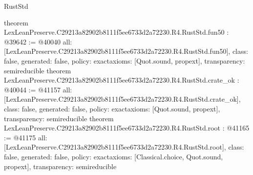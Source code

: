 \begin{lexlean}{RustStd}
\begin{coremodule}
{}
theorem LexLeanPreserve.C29213a82902b8111f5ee6733d2a72230.R4.RustStd.fun50 : @39642 := @40040 {
  all: [LexLeanPreserve.C29213a82902b8111f5ee6733d2a72230.R4.RustStd.fun50],
  class: false,
  generated: false,
  policy: exact{axioms: [Quot.sound, propext]},
  transparency: semireducible
}
theorem LexLeanPreserve.C29213a82902b8111f5ee6733d2a72230.R4.RustStd.crate_ok : @40044 := @41157 {
  all: [LexLeanPreserve.C29213a82902b8111f5ee6733d2a72230.R4.RustStd.crate_ok],
  class: false,
  generated: false,
  policy: exact{axioms: [Quot.sound, propext]},
  transparency: semireducible
}
theorem LexLeanPreserve.C29213a82902b8111f5ee6733d2a72230.R4.RustStd.root : @41165 := @41175 {
  all: [LexLeanPreserve.C29213a82902b8111f5ee6733d2a72230.R4.RustStd.root],
  class: false,
  generated: false,
  policy: exact{axioms: [Classical.choice, Quot.sound, propext]},
  transparency: semireducible
}


\end{coremodule}
\end{lexlean}

